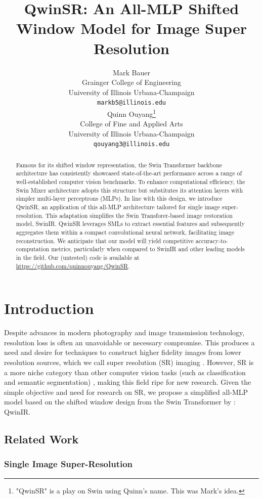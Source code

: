 \documentclass{article}
\title{QwinSR: An All-MLP Shifted Window Model for Image Super Resolution}
\author{
  Mark Bauer \\
  Grainger College of Engineering\\
  University of Illinois Urbana-Champaign\\
  \texttt{markb5@illinois.edu} \\
  \And
  Quinn Ouyang\thanks{"QwinSR" is a play on Swin using Quinn's name. This was Mark's idea.} \\
  College of Fine and Applied Arts \\
  University of Illinois Urbana-Champaign \\
  \texttt{qouyang3@illinois.edu} \\
}
\begin{document}
\maketitle

\begin{abstract}
    Famous for its shifted window representation, the Swin Transformer backbone architecture has consistently showcased state-of-the-art performance across a range of well-established computer vision benchmarks. To enhance computational efficiency, the Swin Mixer architecture adopts this structure but substitutes its attention layers with simpler multi-layer perceptrons (MLPs). In line with this design, we introduce QwinSR, an application of this all-MLP architecture tailored for single image super-resolution. This adaptation simplifies the Swin Transforer-based image restoration model, SwinIR. QwinSR leverages SMLs to extract essential features and subsequently aggregates them within a compact convolutional neural network, facilitating image reconstruction. We anticipate that our model will yield competitive accuracy-to-computation metrics, particularly when compared to SwinIR and other leading models in the field. Our (untested) code is available at \url{https://github.com/quinnouyang/QwinSR}.
\end{abstract}

\section{Introduction}

Despite advances in modern photography and image transmission technology, resolution loss is often an unavoidable or necessary compromise. This produces a need and desire for techniques to construct higher fidelity images from lower resolution sources, which we call super resolution (SR) imaging \citep{Overview}. However, SR is a more niche category than other computer vision tasks (such as classification and semantic segmentation) \citep{PapersWithCode}, making this field ripe for new research. Given the simple objective and need for research on SR, we propose a simplified all-MLP model based on the shifted window design from the Swin Transformer by \citet{SwinTransformer}: QwinIR.

\subsection{Related Work}

\subsubsection{Single Image Super-Resolution}
\end{document}
